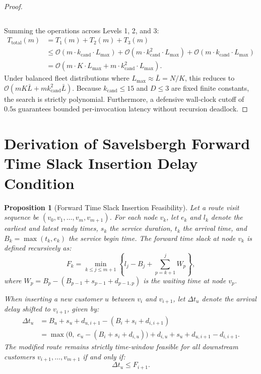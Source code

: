\documentclass{article}
\newtheorem{proposition}{Proposition}
\begin{document}
\begin{proof}
\begin{enumerate}
\begin{equation}
    \end{equation}
\end{enumerate}
Summing the operations across Levels 1, 2, and 3:
\begin{align}
T_{\text{total}}(m) &= T_1(m) + T_2(m) + T_3(m) \\
&\le \mathcal{O}(m \cdot k_{\text{cand}} \cdot L_{\max}) + \mathcal{O}(m \cdot k_{\text{cand}}^2 \cdot L_{\max}) + \mathcal{O}(m \cdot k_{\text{cand}} \cdot L_{\max}) \\
&= \mathcal{O}\left( m \cdot K \cdot L_{\max} + m \cdot k_{\text{cand}}^2 \cdot L_{\max} \right).
\end{align}
Under balanced fleet distributions where $L_{\max} \approx \bar{L} = N/K$, this reduces to $\mathcal{O}(m K \bar{L} + m k_{\text{cand}}^2 \bar{L})$. Because $k_{\text{cand}} \le 15$ and $D \le 3$ are fixed finite constants, the search is strictly polynomial. Furthermore, a defensive wall-clock cutoff of $0.5\text{s}$ guarantees bounded per-invocation latency without recursion deadlock.
\end{proof}

\section{Derivation of Savelsbergh Forward Time Slack Insertion Delay Condition}

\begin{proposition}[Forward Time Slack Insertion Feasibility]
Let a route visit sequence be $(v_0, v_1, \dots, v_m, v_{m+1})$. For each node $v_k$, let $e_k$ and $l_k$ denote the earliest and latest ready times, $s_k$ the service duration, $t_k$ the arrival time, and $B_k = \max(t_k, e_k)$ the service begin time. The forward time slack at node $v_k$ is defined recursively as:
\begin{equation}
F_k = \min_{k \le j \le m+1} \left\{ l_j - B_j + \sum_{p=k+1}^j W_p \right\},
\end{equation}
where $W_p = B_p - (B_{p-1} + s_{p-1} + d_{p-1, p})$ is the waiting time at node $v_p$.

When inserting a new customer $u$ between $v_i$ and $v_{i+1}$, let $\Delta t_u$ denote the arrival delay shifted to $v_{i+1}$, given by:
\begin{align}
\Delta t_u &= B_u + s_u + d_{u, i+1} - (B_i + s_i + d_{i, i+1}) \nonumber \\
&= \max\bigl(0, \; e_u - (B_i + s_i + d_{i, u})\bigr) + d_{i, u} + s_u + d_{u, i+1} - d_{i, i+1}.
\end{align}
The modified route remains strictly time-window feasible for all downstream customers $v_{i+1}, \dots, v_{m+1}$ if and only if:
\begin{equation}
\Delta t_u \le F_{i+1}.
\end{equation}
\end{proposition}
\end{document}
